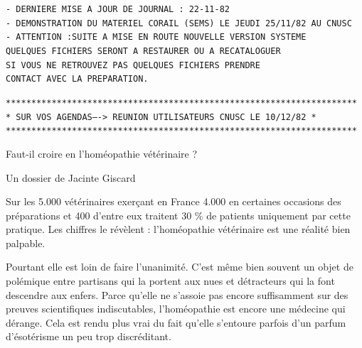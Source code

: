 \texttt{- DERNIERE MISE A JOUR DE JOURNAL : 22-11-82}\\
\texttt{- DEMONSTRATION DU MATERIEL CORAIL (SEMS) LE JEUDI 25/11/82 AU CNUSC}\\
\texttt{- ATTENTION :\quad SUITE A MISE EN ROUTE NOUVELLE VERSION SYSTEME}\\
\texttt{QUELQUES FICHIERS SERONT A RESTAURER OU A RECATALOGUER}\\
\texttt{SI VOUS NE RETROUVEZ PAS QUELQUES FICHIERS PRENDRE}\\
\texttt{CONTACT AVEC LA PREPARATION.}

{\scriptsize\texttt{*********************************************************************}\\
\texttt{* SUR VOS AGENDAS----> REUNION UTILISATEURS CNUSC LE 10/12/82\qquad\ *}\\
\texttt{*********************************************************************}}




Faut-il croire en l'homéopathie vétérinaire ?

Un dossier de Jacinte Giscard

Sur les 5.000 vétérinaires exerçant en France 4.000
 en certaines occasions des préparations
 et 400 d'entre eux traitent 30 \% de
 patients uniquement par cette pratique. Les chiffres le révèlent : l'homéopathie vétérinaire est une réalité bien palpable.

Pourtant elle est loin de faire l'unanimité. C'est
même bien souvent un objet de polémique entre partisans qui la portent aux nues et détracteurs qui la font
descendre aux enfers. Parce qu'elle ne s'assoie pas
encore suffisamment sur des preuves scientifiques
indiscutables, l'homéopathie est encore une médecine
qui dérange. Cela est rendu plus vrai du fait qu'elle
s'entoure parfois d'un parfum d'ésotérisme un peu trop
discréditant.

